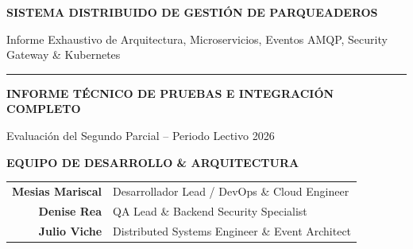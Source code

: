 \documentclass[11pt,a4paper]{article}
\begin{document}
\begin{titlepage}
\vspace*{4.2cm}

\begin{center}

    {\fontsize{20}{28}\selectfont \bfseries \textcolor{brandTeal}{SISTEMA DISTRIBUIDO DE GESTIÓN DE PARQUEADEROS}\par}
    \vspace{0.4cm}
    {\large \sffamily \textcolor{brandMuted}{Informe Exhaustivo de Arquitectura, Microservicios, Eventos AMQP, Security Gateway \& Kubernetes}\par}
    
    \vspace{0.8cm}
    \textcolor{brandTeal}{\rule{0.5\textwidth}{1.5pt}}
    \vspace{0.8cm}

    {\Large \bfseries \textcolor{brandInk}{INFORME TÉCNICO DE PRUEBAS E INTEGRACIÓN COMPLETO}\par}
    \vspace{0.2cm}
    {\small \textcolor{brandMuted}{Evaluación del Segundo Parcial -- Periodo Lectivo 2026}\par}

    \vspace{1.4cm}

    \begin{tcolorbox}[
        enhanced,
        colback=brandSurface,
        colframe=brandTeal,
        arc=14pt,
        width=0.92\textwidth,
        boxrule=1.5pt,
        shadow={0mm}{4mm}{15mm}{black!12}
    ]
        \centering
        \vspace{0.2cm}
        {\large \bfseries \textcolor{brandTeal}{EQUIPO DE DESARROLLO \& ARQUITECTURA}} \\[0.4cm]
        
        \begin{tabular}{r l}
            \textbf{\textcolor{brandInk}{Mesias Mariscal}} & \quad \textcolor{brandMuted}{Desarrollador Lead / DevOps \& Cloud Engineer} \\[0.15cm]
            \textbf{\textcolor{brandInk}{Denise Rea}} & \quad \textcolor{brandMuted}{QA Lead \& Backend Security Specialist} \\[0.15cm]
            \textbf{\textcolor{brandInk}{Julio Viche}} & \quad \textcolor{brandMuted}{Distributed Systems Engineer \& Event Architect} \\
        \end{tabular}


\end{tcolorbox}
\end{center}
\end{titlepage}
\end{document}

